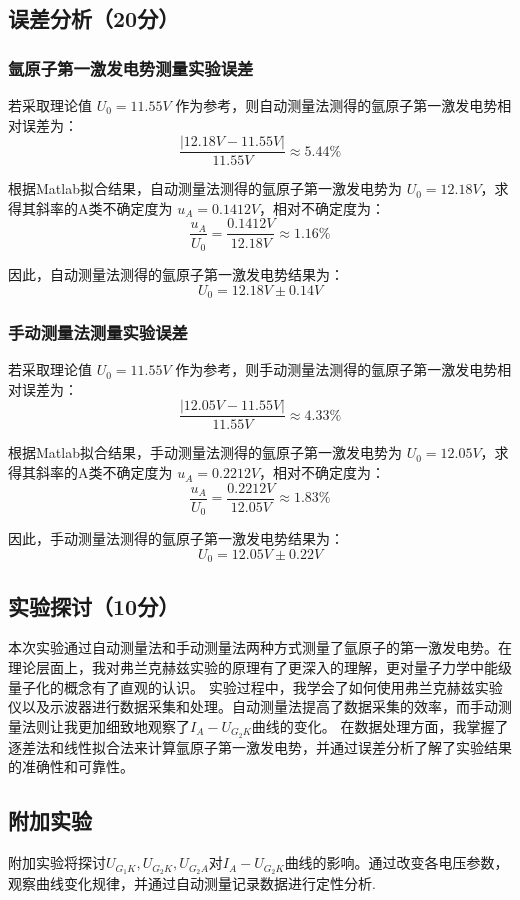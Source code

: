 \documentclass[]{../template/Report}%
\begin{document}
\begin{fullreportonly}
\subsection{误差分析（20分）}
\subsubsection{氩原子第一激发电势测量实验误差}
若采取理论值 $U_0 = 11.55 V$ 作为参考，则自动测量法测得的氩原子第一激发电势相对误差为：
\[\frac{|12.18 V - 11.55 V|}{11.55 V} \approx 5.44\%\]

根据Matlab拟合结果，自动测量法测得的氩原子第一激发电势为 $U_0 = 12.18 V$，求得其斜率的A类不确定度为 $u_A = 0.1412 V$，相对不确定度为：
\[\frac{u_A}{U_0} = \frac{0.1412 V}{12.18 V} \approx 1.16\%\]

因此，自动测量法测得的氩原子第一激发电势结果为：
$$\boxed{U_0 = 12.18 V \pm 0.14 V}$$

\subsubsection{手动测量法测量实验误差}
若采取理论值 $U_0 = 11.55 V$ 作为参考，则手动测量法测得的氩原子第一激发电势相对误差为：
\[\frac{|12.05 V - 11.55 V|}{11.55 V} \approx 4.33\%\]

根据Matlab拟合结果，手动测量法测得的氩原子第一激发电势为 $U_0 = 12.05 V$，求得其斜率的A类不确定度为 $u_A = 0.2212 V$，相对不确定度为：
\[\frac{u_A}{U_0} = \frac{0.2212 V}{12.05 V} \approx 1.83\%\]

因此，手动测量法测得的氩原子第一激发电势结果为：
$$\boxed{U_0 = 12.05 V \pm 0.22 V}$$

\subsection{实验探讨（10分）}
本次实验通过自动测量法和手动测量法两种方式测量了氩原子的第一激发电势。在理论层面上，我对弗兰克赫兹实验的原理有了更深入的理解，更对量子力学中能级量子化的概念有了直观的认识。
实验过程中，我学会了如何使用弗兰克赫兹实验仪以及示波器进行数据采集和处理。自动测量法提高了数据采集的效率，而手动测量法则让我更加细致地观察了$I_A-U_{G_2K}$曲线的变化。
在数据处理方面，我掌握了逐差法和线性拟合法来计算氩原子第一激发电势，并通过误差分析了解了实验结果的准确性和可靠性。

\subsection{附加实验}
附加实验将探讨$U_{G_1K}, U_{G_2K}, U_{G_2A}$对$I_A-U_{G_2K}$曲线的影响。通过改变各电压参数，观察曲线变化规律，并通过自动测量记录数据进行定性分析.





\end{fullreportonly}
\end{document}
